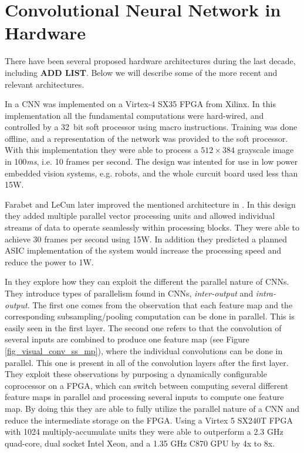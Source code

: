 \section{Convolutional Neural Network in Hardware}

There have been several proposed hardware architectures during the last decade, including \textbf{ADD LIST}. Below we will describe some of the more recent and relevant architectures. 

In \cite{Farabet2009} a CNN was implemented on a Virtex-4 SX35 FPGA from Xilinx. In this implementation all the fundamental computations were hard-wired, and controlled by a 32~bit soft processor using macro instructions. Training was done offline, and a representation of the network was provided to the soft processor. With this implementation they were able to process a $ 512 \times 384 $ grayscale image in 100\textit{ms}, i.e. 10 frames per second. The design was intented for use in low power embedded vision  systems, e.g. robots, and the whole curcuit board used less than 15W.

Farabet and LeCun later improved the mentioned architecture in \cite{Farabet2010}. In this design they added multiple parallel vector processing units and allowed individual
streams of data to operate seamlessly within processing blocks. They were able to achieve 30 frames per second using 15W. In addition they predicted a planned ASIC implementation of the system would increase the processing speed and reduce the power to 1W. 


In \cite{Chakradhar2010} they explore how they can exploit the different the parallel nature of CNNs. They introduce types of parallelism found in CNNs, \textit{inter-output} and \textit{intra-output}. The first one comes from the observation that each feature map and the corresponding subsampling/pooling computation can be done in parallel. This is easily seen in the first layer. The second one refers to that the convolution of several inputs are combined to produce one feature map (see Figure \ref{fig_visual_conv_ss_mp}), where the individual convolutions can be done in parallel. This one is present in all of the convolution layers after the first layer. They exploit these observations by purposing a dynamically configurable coprocessor on a FPGA, which can switch between computing several different feature maps in parallel and processing several inputs to compute one feature map. By doing this they are able to fully utilize the parallel nature of a CNN and reduce the intermediate storage on the FPGA. Using a Virtex 5 SX240T FPGA with 1024 multiply-accumulate units they were able to outperform  a 2.3 GHz quad-core, dual socket Intel Xeon, and a 1.35 GHz C870 GPU by 4x to 8x. 

